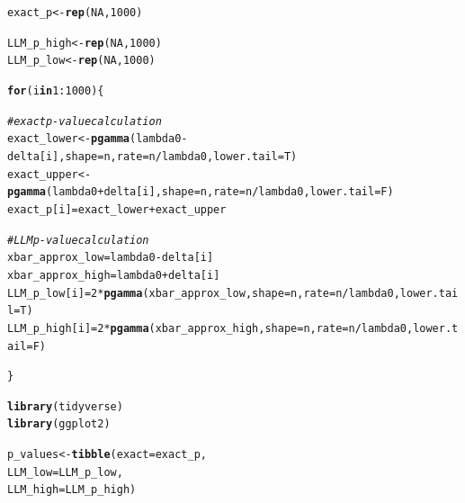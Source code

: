 \documentclass{article}\usepackage[]{graphicx}\usepackage[]{xcolor}
\makeatletter
\newcommand{\hlnum}[1]{\textcolor[rgb]{0.686,0.059,0.569}{#1}}%
\newcommand{\hlcom}[1]{\textcolor[rgb]{0.678,0.584,0.686}{\textit{#1}}}%
\newcommand{\hlopt}[1]{\textcolor[rgb]{0,0,0}{#1}}%
\newcommand{\hldef}[1]{\textcolor[rgb]{0.345,0.345,0.345}{#1}}%
\newcommand{\hlkwa}[1]{\textcolor[rgb]{0.161,0.373,0.58}{\textbf{#1}}}%
\newcommand{\hlkwb}[1]{\textcolor[rgb]{0.69,0.353,0.396}{#1}}%
\newcommand{\hlkwc}[1]{\textcolor[rgb]{0.333,0.667,0.333}{#1}}%
\newcommand{\hlkwd}[1]{\textcolor[rgb]{0.737,0.353,0.396}{\textbf{#1}}}%
\newenvironment{kframe}{%
 \def\at@end@of@kframe{}%
 \ifinner\ifhmode%
  \def\at@end@of@kframe{\end{minipage}}%
  \begin{minipage}{\columnwidth}%
 \fi\fi%
 \def\FrameCommand##1{\hskip\@totalleftmargin \hskip-\fboxsep
 \colorbox{shadecolor}{##1}\hskip-\fboxsep
     \hskip-\linewidth \hskip-\@totalleftmargin \hskip\columnwidth}%
 \MakeFramed {\advance\hsize-\width
   \@totalleftmargin\z@ \linewidth\hsize
   \@setminipage}}%
 {\par\unskip\endMakeFramed%
 \at@end@of@kframe}
\newenvironment{knitrout}{}{} %
\makeatother
\begin{document}
\begin{enumerate}
\begin{enumerate}
\begin{knitrout}
\begin{kframe}
\begin{alltt}
\hldef{exact_p} \hlkwb{<-} \hlkwd{rep}\hldef{(}\hlnum{NA}\hldef{,} \hlnum{1000}\hldef{)}

\hldef{LLM_p_high} \hlkwb{<-} \hlkwd{rep}\hldef{(}\hlnum{NA}\hldef{,} \hlnum{1000}\hldef{)}
\hldef{LLM_p_low} \hlkwb{<-} \hlkwd{rep}\hldef{(}\hlnum{NA}\hldef{,} \hlnum{1000}\hldef{)}

\hlkwa{for}\hldef{(i} \hlkwa{in} \hlnum{1}\hlopt{:}\hlnum{1000}\hldef{)\{}

  \hlcom{#exact p-value calculation}
  \hldef{exact_lower} \hlkwb{<-} \hlkwd{pgamma}\hldef{(lambda0}\hlopt{-}\hldef{delta[i],} \hlkwc{shape} \hldef{= n,} \hlkwc{rate} \hldef{= n}\hlopt{/}\hldef{lambda0,} \hlkwc{lower.tail} \hldef{= T)}
  \hldef{exact_upper} \hlkwb{<-} \hlkwd{pgamma}\hldef{(lambda0}\hlopt{+}\hldef{delta[i],} \hlkwc{shape} \hldef{= n,} \hlkwc{rate} \hldef{= n}\hlopt{/}\hldef{lambda0,} \hlkwc{lower.tail} \hldef{= F)}
  \hldef{exact_p[i]} \hlkwb{=} \hldef{exact_lower} \hlopt{+} \hldef{exact_upper}

  \hlcom{#LLM p-value calculation}
  \hldef{xbar_approx_low} \hlkwb{=} \hldef{lambda0}\hlopt{-}\hldef{delta[i]}
  \hldef{xbar_approx_high} \hlkwb{=} \hldef{lambda0} \hlopt{+} \hldef{delta[i]}
  \hldef{LLM_p_low[i]} \hlkwb{=} \hlnum{2} \hlopt{*} \hlkwd{pgamma}\hldef{(xbar_approx_low,} \hlkwc{shape} \hldef{= n,} \hlkwc{rate} \hldef{= n}\hlopt{/}\hldef{lambda0,} \hlkwc{lower.tail} \hldef{= T)}
  \hldef{LLM_p_high[i]} \hlkwb{=} \hlnum{2} \hlopt{*} \hlkwd{pgamma}\hldef{(xbar_approx_high,} \hlkwc{shape} \hldef{= n,} \hlkwc{rate} \hldef{= n}\hlopt{/}\hldef{lambda0,} \hlkwc{lower.tail} \hldef{= F)}

\hldef{\}}


\hlkwd{library}\hldef{(tidyverse)}
\hlkwd{library}\hldef{(ggplot2)}

\hldef{p_values} \hlkwb{<-} \hlkwd{tibble}\hldef{(}\hlkwc{exact} \hldef{= exact_p,}
                   \hlkwc{LLM_low} \hldef{= LLM_p_low,}
                   \hlkwc{LLM_high} \hldef{= LLM_p_high)}



\end{alltt}
\end{kframe}
\end{knitrout}
\end{enumerate}
\end{enumerate}
\end{document}
